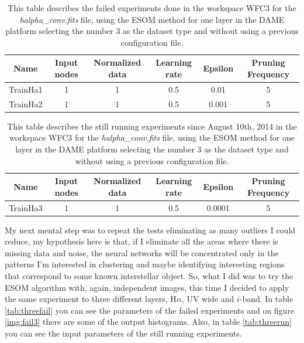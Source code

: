 \documentclass[11pt,fleqn]{book} %
\begin{document}
\begin{table}[h!]
  \centering
    \begin{tabular}{ c c c c c c }
    \hline\hline
    
    Name & Input nodes & Normalized data & Learning rate & Epsilon & Pruning Frequency\\
    \hline
    
    TrainHa1 & 1 & 1 & 0.5 & 0.01 & 5\\
    TrainHa2 & 1 & 1 & 0.5 & 0.001 & 5\\
    
    \hline
  \end{tabular}
  \caption{This table describes the failed experiments done in the workspace WFC3 for the \emph{halpha\_conv.fits} file, using the ESOM method for one layer in the DAME platform selecting the number 3 as the dataset type and without using a previous configuration file.}
  \label{tab:hafailed}
\end{table}

\begin{table}[h!]
  \centering
    \begin{tabular}{ c c c c c c }
    \hline\hline
    
    Name & Input nodes & Normalized data & Learning rate & Epsilon & Pruning Frequency\\
    \hline
    
    TrainHa3 & 1 & 1 & 0.5 & 0.0001 & 5\\
    
    \hline
  \end{tabular}
  \caption{This table describes the still running experiments since August 10th, 2014 in the workspace WFC3 for the \emph{halpha\_conv.fits} file, using the ESOM method for one layer in the DAME platform selecting the number 3 as the dataset type and without using a previous configuration file.}
  \label{tab:harun}
\end{table}

My next mental step was to repeat the tests eliminating as many outliers I could reduce, my hypothesis here is that, if I eliminate all the areas where there is missing data and noise, the neural networks will be concentrated only in the patterns I'm interested in clustering and maybe identifying interesting regions that correspond to some known interstellar object. So, what I did was to try the ESOM algorithm with, again, independent images, this time I decided to apply the same experiment to three different layers, H$\alpha$, UV wide and $i$-band. In table \ref{tab:threefail} you can see the parameters of the failed experiments and on figure \ref{img:fail3} there are some of the output histograms. Also, in table \ref{tab:threerun} you can see the input parameters of the still running experiments.
\end{document}
